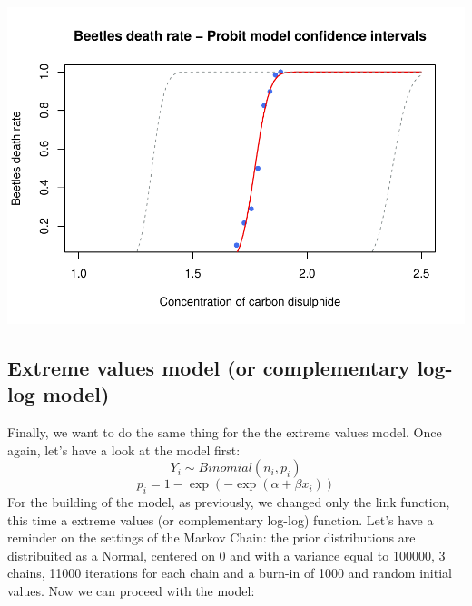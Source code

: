 \documentclass[]{article}
\begin{document}
\includegraphics{FinalProject-SDSII_files/figure-latex/unnamed-chunk-23-1.pdf}

\hypertarget{extreme-values-model-or-complementary-log-log-model}{%
\subsection{Extreme values model (or complementary log-log
model)}\label{extreme-values-model-or-complementary-log-log-model}}

Finally, we want to do the same thing for the the extreme values model.
Once again, let's have a look at the model first:
\[ Y_i \sim Binomial(n_i, p_i)\]
\[p_i = 1 - \exp(- \exp(\alpha + \beta x_i))\] For the building of the
model, as previously, we changed only the link function, this time a
extreme values (or complementary log-log) function. Let's have a
reminder on the settings of the Markov Chain: the prior distributions
are distribuited as a Normal, centered on 0 and with a variance equal to
100000, 3 chains, 11000 iterations for each chain and a burn-in of 1000
and random initial values. Now we can proceed with the model:
\end{document}
